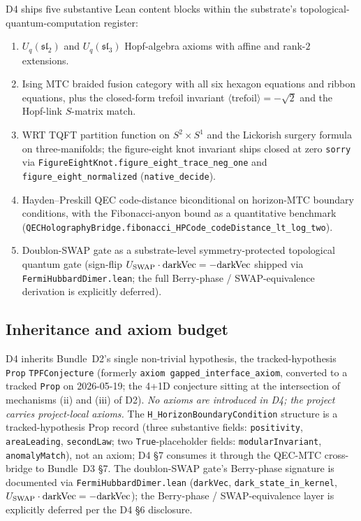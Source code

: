 \documentclass[aps,prd,reprint,nofootinbib,superscriptaddress]{revtex4-2}
\begin{document}
D4 ships five substantive Lean content blocks within the substrate's
topological-quantum-computation register:

\begin{enumerate}
\item $U_q(\mathfrak{sl}_2)$ and $U_q(\mathfrak{sl}_3)$ Hopf-algebra
  axioms with affine and rank-$2$ extensions.
\item Ising MTC braided fusion category with all six hexagon equations
  and ribbon equations, plus the closed-form trefoil invariant
  $\langle\mathrm{trefoil}\rangle = -\sqrt{2}$ and the Hopf-link
  $S$-matrix match.
\item WRT TQFT partition function on $S^{2}\times S^{1}$ and the
  Lickorish surgery formula on three-manifolds; the figure-eight knot
  invariant ships closed at zero \texttt{sorry} via
  \texttt{FigureEightKnot.figure\_eight\_trace\_neg\_one} and
  \texttt{figure\_eight\_normalized} (\texttt{native\_decide}).
\item Hayden--Preskill QEC code-distance biconditional on horizon-MTC
  boundary conditions, with the Fibonacci-anyon bound as a quantitative
  benchmark
  (\texttt{QECHolographyBridge.fibonacci\_HPCode\_codeDistance\_lt\_log\_two}).
\item Doublon-SWAP gate as a substrate-level symmetry-protected
  topological quantum gate (sign-flip $U_{\rm SWAP}\cdot\mathrm{darkVec}
  = -\mathrm{darkVec}$ shipped via \texttt{FermiHubbardDimer.lean};
  the full Berry-phase / SWAP-equivalence derivation is explicitly
  deferred).
\end{enumerate}

\subsection{Inheritance and axiom budget}

D4 inherits Bundle~D2's single non-trivial hypothesis, the
tracked-hypothesis \texttt{Prop} \texttt{TPFConjecture} (formerly
\texttt{axiom gapped\_interface\_axiom}, converted to a tracked
\texttt{Prop} on 2026-05-19; the 4+1D conjecture sitting at the
intersection of mechanisms (ii) and (iii) of D2). \emph{No axioms are
introduced in D4; the project carries \axiomcount{} project-local
axioms.} The
\texttt{H\_HorizonBoundaryCondition} structure is a tracked-hypothesis
Prop record (three substantive fields: \texttt{positivity},
\texttt{areaLeading}, \texttt{secondLaw}; two \texttt{True}-placeholder
fields: \texttt{modularInvariant}, \texttt{anomalyMatch}), not an
axiom; D4 \S 7 consumes it through the QEC-MTC cross-bridge to
Bundle~D3 \S 7. The doublon-SWAP gate's Berry-phase signature is
documented via \texttt{FermiHubbardDimer.lean} (\texttt{darkVec},
\texttt{dark\_state\_in\_kernel}, $U_{\rm SWAP}\cdot\mathrm{darkVec} =
-\mathrm{darkVec}$); the Berry-phase / SWAP-equivalence layer is
explicitly deferred per the D4 §6 disclosure.
\end{document}
